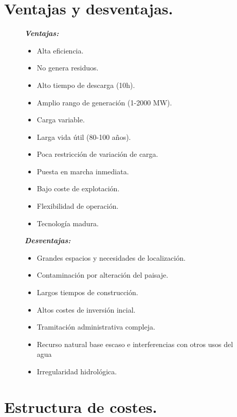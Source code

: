 	\section{Ventajas y desventajas.}
		\begin{figure}[H]
			\begin{minipage}[t]{0.5\textwidth}
				\textbf{\textit{Ventajas:}}
					\begin{itemize}
						\item Alta eficiencia.
						\item No genera residuos.
						\item Alto tiempo de descarga (10h).
						\item Amplio rango de generación (1-2000 MW).
						\item Carga variable.
						\item Larga vida útil (80-100 años).
						\item Poca restricción de variación de carga.
						\item Puesta en marcha inmediata.
						\item Bajo coste de explotación.
						\item Flexibilidad de operación.
						\item Tecnología madura.
					\end{itemize}
			\end{minipage}
			\begin{minipage}[t]{0.5\textwidth}
				\textbf{\textit{Desventajas:}}
					\begin{itemize}
						\item Grandes espacios y necesidades de localización.
						\item Contaminación por alteración del paisaje.
						\item Largos tiempos de construcción.
						\item Altos costes de inversión incial.
						\item Tramitación administrativa compleja.
						\item Recurso natural base escaso e interferencias con otros usos del agua
						\item Irregularidad hidrológica.
					\end{itemize}
			\end{minipage}
		\end{figure}
		
	\section{Estructura de costes.}
		
